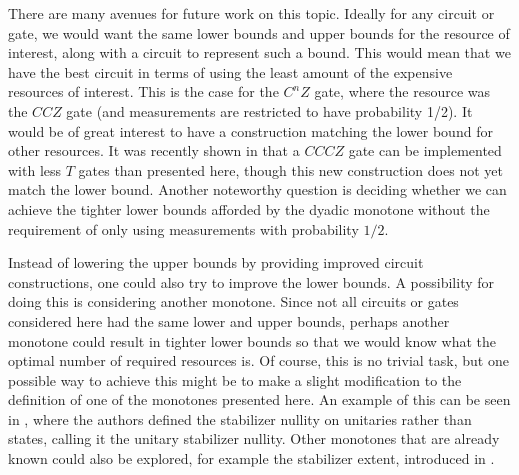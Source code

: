 \documentclass[12pt]{dalthesis}
\begin{document}
There are many avenues for future work on this topic. Ideally for any circuit or gate, we would want the same lower bounds and upper bounds for the resource of interest, along with a circuit to represent such a bound. This would mean that we have the best circuit in terms of using the least amount of the expensive resources of interest. This is the case for the $C^nZ$ gate, where the resource was the $CCZ$ gate (and measurements are restricted to have probability 1/2). It would be of great interest to have a construction matching the lower bound for other resources. It was recently shown in \cite{gidney2021cccz} that a $CCCZ$ gate can be implemented with less $T$ gates than presented here, though this new construction does not yet match the lower bound. Another noteworthy question is deciding whether we can achieve the tighter lower bounds afforded by the dyadic monotone without the requirement of only using measurements with probability $1/2$.

Instead of lowering the upper bounds by providing improved circuit constructions, one could also try to improve the lower bounds. A possibility for doing this is considering another monotone. Since not all circuits or gates considered here had the same lower and upper bounds, perhaps another monotone could result in tighter lower bounds so that we would know what the optimal number of required resources is. Of course, this is no trivial task, but one possible way to achieve this might be to make a slight modification to the definition of one of the monotones presented here. An example of this can be seen in \cite{jiang2021lower}, where the authors defined the stabilizer nullity on unitaries rather than states, calling it the unitary stabilizer nullity. Other monotones that are already known could also be explored, for example the stabilizer extent, introduced in \cite{beverland2019lower}.



\end{document}
